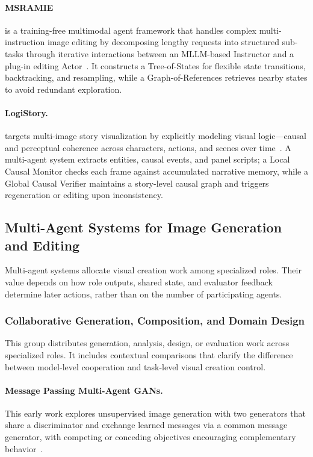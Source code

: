 \paragraph{MSRAMIE}
 is a training-free multimodal agent framework that handles complex multi-instruction image editing by decomposing lengthy requests into structured sub-tasks through iterative interactions between an MLLM-based Instructor and a plug-in editing Actor~\cite{avg260316967}. It constructs a Tree-of-States for flexible state transitions, backtracking, and resampling, while a Graph-of-References retrieves nearby states to avoid redundant exploration. 

\paragraph{LogiStory.}
 targets multi-image story visualization by explicitly modeling visual logic—causal and perceptual coherence across characters, actions, and scenes over time~\cite{avg260328082}. A multi-agent system extracts entities, causal events, and panel scripts; a Local Causal Monitor checks each frame against accumulated narrative memory, while a Global Causal Verifier maintains a story-level causal graph and triggers regeneration or editing upon inconsistency.

\subsection{Multi-Agent Systems for Image Generation and Editing}
Multi-agent systems allocate visual creation work among specialized roles. Their value depends on how role outputs, shared state, and evaluator feedback determine later actions, rather than on the number of participating agents.

\subsubsection{Collaborative Generation, Composition, and Domain Design}
This group distributes generation, analysis, design, or evaluation work across specialized roles. It includes contextual comparisons that clarify the difference between model-level cooperation and task-level visual creation control.

\paragraph{Message Passing Multi-Agent GANs.}
This early work explores unsupervised image generation with two generators that share a discriminator and exchange learned messages via a common message generator, with competing or conceding objectives encouraging complementary behavior~\cite{avg161201294}. 

